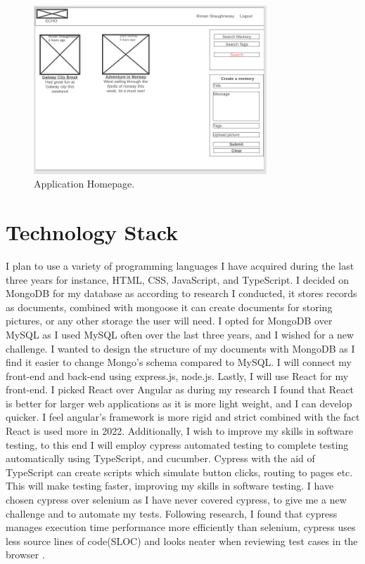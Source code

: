 \begin{figure}[h!]
    \centering
    \includegraphics[width=0.78\textwidth]{images/WireFrame.png}
    \caption{Application Homepage.}
    \label{image:AppHome}
\end{figure}

\section{Technology Stack}\label{section:stack}
I plan to use a variety of programming languages I have acquired during the last three years for instance, HTML, CSS, JavaScript, and TypeScript. I decided on MongoDB for my database as according to research I conducted, it stores records as documents, combined with mongoose it can create documents for storing pictures, or any other storage the user will need. I opted for MongoDB over MySQL as I used MySQL often over the last three years, and I wished for a new challenge. I wanted to design the structure of my documents with MongoDB as I find it easier to change Mongo's schema compared to MySQL. I will connect my front-end and back-end using express.js, node.js. Lastly, I will use React for my front-end. I picked React over Angular as during my research I found that React is better for larger web applications as it is more light weight, and I can develop quicker. I feel angular's framework is more rigid and strict combined with the fact React is used more in 2022. Additionally, I wish to improve my skills in software testing, to this end I will employ cypress automated testing to complete testing automatically using TypeScript, and cucumber. Cypress with the aid of TypeScript can create scripts which simulate button clicks, routing to pages etc. This will make testing faster, improving my skills in software testing. I have chosen cypress over selenium as I have never covered cypress, to give me a new challenge and to automate my tests. Following research, I found that cypress manages execution time performance more efficiently than selenium, cypress uses less source lines of code(SLOC) and looks neater when reviewing test cases in the browser \cite{cypresssel}.

